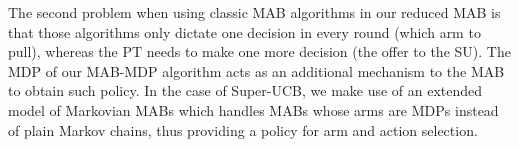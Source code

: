 The second problem when using classic MAB algorithms in our reduced MAB is that those algorithms only dictate one decision in every round (which arm to pull), whereas the PT needs to make one more decision (the offer to the SU).  The MDP of our MAB-MDP algorithm acts as an additional mechanism to the MAB to obtain such policy. In the case of Super-UCB, we make use of an extended model of Markovian MABs which handles MABs whose arms are MDPs instead of plain Markov chains, thus providing a policy for arm and action selection. 



  


